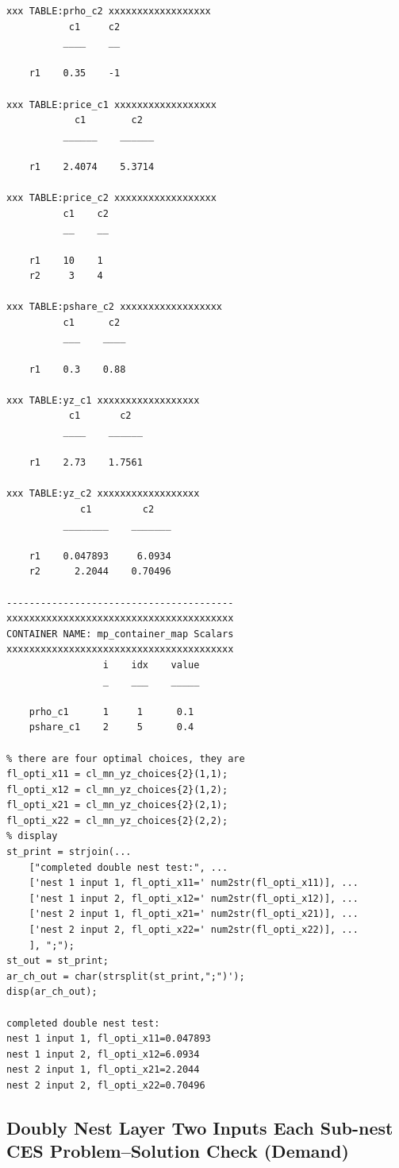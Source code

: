 \documentclass[
]{book}
\begin{document}
\begin{verbatim}
xxx TABLE:prho_c2 xxxxxxxxxxxxxxxxxx
           c1     c2
          ____    __

    r1    0.35    -1

xxx TABLE:price_c1 xxxxxxxxxxxxxxxxxx
            c1        c2  
          ______    ______

    r1    2.4074    5.3714

xxx TABLE:price_c2 xxxxxxxxxxxxxxxxxx
          c1    c2
          __    __

    r1    10    1 
    r2     3    4 

xxx TABLE:pshare_c2 xxxxxxxxxxxxxxxxxx
          c1      c2 
          ___    ____

    r1    0.3    0.88

xxx TABLE:yz_c1 xxxxxxxxxxxxxxxxxx
           c1       c2  
          ____    ______

    r1    2.73    1.7561

xxx TABLE:yz_c2 xxxxxxxxxxxxxxxxxx
             c1         c2   
          ________    _______

    r1    0.047893     6.0934
    r2      2.2044    0.70496

----------------------------------------
xxxxxxxxxxxxxxxxxxxxxxxxxxxxxxxxxxxxxxxx
CONTAINER NAME: mp_container_map Scalars
xxxxxxxxxxxxxxxxxxxxxxxxxxxxxxxxxxxxxxxx
                 i    idx    value
                 _    ___    _____

    prho_c1      1     1      0.1 
    pshare_c1    2     5      0.4 

% there are four optimal choices, they are
fl_opti_x11 = cl_mn_yz_choices{2}(1,1);
fl_opti_x12 = cl_mn_yz_choices{2}(1,2);
fl_opti_x21 = cl_mn_yz_choices{2}(2,1);
fl_opti_x22 = cl_mn_yz_choices{2}(2,2);
% display
st_print = strjoin(...
    ["completed double nest test:", ...
    ['nest 1 input 1, fl_opti_x11=' num2str(fl_opti_x11)], ...
    ['nest 1 input 2, fl_opti_x12=' num2str(fl_opti_x12)], ...
    ['nest 2 input 1, fl_opti_x21=' num2str(fl_opti_x21)], ...
    ['nest 2 input 2, fl_opti_x22=' num2str(fl_opti_x22)], ...
    ], ";");
st_out = st_print;
ar_ch_out = char(strsplit(st_print,";")');
disp(ar_ch_out);

completed double nest test:         
nest 1 input 1, fl_opti_x11=0.047893
nest 1 input 2, fl_opti_x12=6.0934  
nest 2 input 1, fl_opti_x21=2.2044  
nest 2 input 2, fl_opti_x22=0.70496 
\end{verbatim}

\hypertarget{doubly-nest-layer-two-inputs-each-sub-nest-ces-problemsolution-check-demand}{%
\subsection{Doubly Nest Layer Two Inputs Each Sub-nest CES Problem--Solution Check (Demand)}\label{doubly-nest-layer-two-inputs-each-sub-nest-ces-problemsolution-check-demand}}
\end{document}
